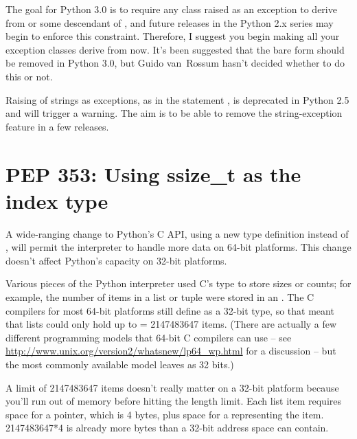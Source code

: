 \documentclass{howto}
\begin{document}
The goal for Python 3.0 is to require any class raised as an exception
to derive from  or some descendant of
, and future releases in the
Python 2.x series may begin to enforce this constraint.  Therefore, I
suggest you begin making all your exception classes derive from
 now.  It's been suggested that the bare
 form should be removed in Python 3.0, but Guido van~Rossum
hasn't decided whether to do this or not.

Raising of strings as exceptions, as in the statement , is deprecated in Python 2.5 and will trigger a
warning.  The aim is to be able to remove the string-exception feature
in a few releases.


\begin{seealso}


\end{seealso}


\section{PEP 353: Using ssize_t as the index type\label{pep-353}}

A wide-ranging change to Python's C API, using a new 
 type definition instead of , 
will permit the interpreter to handle more data on 64-bit platforms.
This change doesn't affect Python's capacity on 32-bit platforms.

Various pieces of the Python interpreter used C's  type to
store sizes or counts; for example, the number of items in a list or
tuple were stored in an .  The C compilers for most 64-bit
platforms still define  as a 32-bit type, so that meant
that lists could only hold up to  = 2147483647 items.
(There are actually a few different programming models that 64-bit C
compilers can use -- see
\url{http://www.unix.org/version2/whatsnew/lp64_wp.html} for a
discussion -- but the most commonly available model leaves 
as 32 bits.)

A limit of 2147483647 items doesn't really matter on a 32-bit platform
because you'll run out of memory before hitting the length limit.
Each list item requires space for a pointer, which is 4 bytes, plus
space for a  representing the item.  2147483647*4 is
already more bytes than a 32-bit address space can contain.
\end{document}
